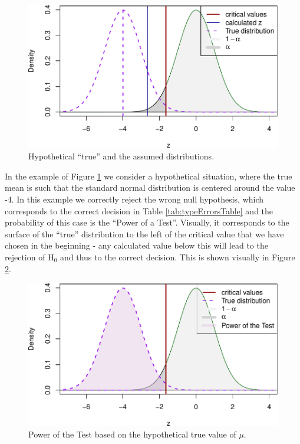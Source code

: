\documentclass[
]{book}
\theoremstyle{definition}
\theoremstyle{definition}
\theoremstyle{definition}
\theoremstyle{definition}
\theoremstyle{remark}
\begin{document}
\begin{figure}
\centering
\includegraphics{Svetunkov---Statistics-for-Business-Analytics_files/figure-latex/powerOfTestVisual02-1.pdf}
\caption{\label{fig:powerOfTestVisual02}Hypothetical ``true'' and the assumed distributions.}
\end{figure}

In the example of Figure \ref{fig:powerOfTestVisual02} we consider a hypothetical situation, where the true mean is such that the standard normal distribution is centered around the value -4. In this example we correctly reject the wrong null hypothesis, which corresponds to the correct decision in Table \ref{tab:typeErrorsTable} and the probability of this case is the ``Power of a Test''. Visually, it corresponds to the surface of the ``true'' distribution to the left of the critical value that we have chosen in the beginning - any calculated value below this will lead to the rejection of H\(_0\) and thus to the correct decision. This is shown visually in Figure \ref{fig:powerOfTestVisual03}.

\begin{figure}
\centering
\includegraphics{Svetunkov---Statistics-for-Business-Analytics_files/figure-latex/powerOfTestVisual03-1.pdf}
\caption{\label{fig:powerOfTestVisual03}Power of the Test based on the hypothetical true value of \(\mu\).}
\end{figure}
\end{document}
